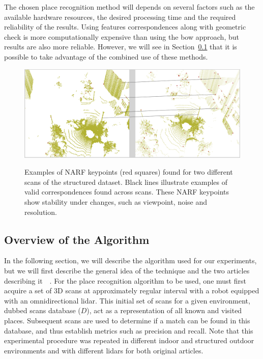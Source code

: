 The chosen place recognition method will depends on several factors such as the available hardware resources, the desired processing time and the required reliability of the results. Using features correspondences along with geometric check is more computationally expensive than using the \gls*{bow} approach, but results are also more reliable. However, we will see in Section~\ref{ssec:chap_slam_algo} that it is possible to take advantage of the combined use of these methods.

\begin{figure}[H]
    \centering
    \includegraphics[width=0.995\linewidth]{img/chap_slam/features_line.png}\\
    \caption[Examples of NARF keypoints found for two different scans with examples of correspondences.]{Examples of NARF keypoints (red squares) found for two different scans of the structured dataset. Black lines illustrate examples of valid correspondences found across scans. These NARF keypoints show stability under changes, such as viewpoint, noise and resolution.}
    \label{fig:chap_slam_features_correspondences}
\end{figure}


\subsection{Overview of the Algorithm}
\label{ssec:chap_slam_algo}

In the following section, we will describe the algorithm used for our experiments, but we will first describe the general idea of the technique and the two articles describing it~\citep{Steder2010}~\cite{Steder2011b}. For the place recognition algorithm to be used, one must first acquire a set of 3D scans at approximately regular interval with a robot equipped with an omnidirectional \gls*{lidar}. This initial set of scans for a given environment, dubbed scans database ($D$), act as a representation of all known and visited places. Subsequent scans are used to determine if a match can be found in this database, and thus establish metrics such as precision and recall. Note that this experimental procedure was repeated in different indoor and structured outdoor environments and with different \gls*{lidar}s for both original articles.

